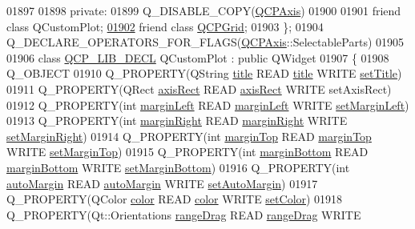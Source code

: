 \begin{DoxyCode}
01897   
01898 \textcolor{keyword}{private}:
01899   Q\_DISABLE\_COPY(\hyperlink{a00025}{QCPAxis})
01900   
01901   friend class QCustomPlot;
\hypertarget{a00116_source_l01902}{}\hyperlink{a00025_a061e177f585549fc31f780852e2bd6fe}{01902}   friend class \hyperlink{a00030_de/df3/a00185}{QCPGrid};
01903 \};
01904 Q\_DECLARE\_OPERATORS\_FOR\_FLAGS(\hyperlink{a00025}{QCPAxis}::SelectableParts)
01905 
01906 class \hyperlink{a00116_a5eaab02224a642ded7fb8951e973a02c}{QCP\_LIB\_DECL} QCustomPlot : public QWidget
01907 \{
01908   Q\_OBJECT
01910   Q\_PROPERTY(QString \hyperlink{a00116_aec7f0fb0be1d3a0a946f0ded3a860d20}{title} READ \hyperlink{a00116_aec7f0fb0be1d3a0a946f0ded3a860d20}{title} WRITE \hyperlink{a00116_a84257c1e1f984b3932245069428f3176}{setTitle})
01911   Q\_PROPERTY(QRect \hyperlink{a00116_ad1541f59ff23332e3245b74af2fd3833}{axisRect} READ \hyperlink{a00116_ad1541f59ff23332e3245b74af2fd3833}{axisRect} WRITE setAxisRect)
01912   Q\_PROPERTY(\textcolor{keywordtype}{int} \hyperlink{a00116_ae58a601ccf3bfb4a4f05ad2c30cf3f7b}{marginLeft} READ \hyperlink{a00116_ae58a601ccf3bfb4a4f05ad2c30cf3f7b}{marginLeft} WRITE 
      \hyperlink{a00116_a3be3a999be642fc336d4f4bf8299b27a}{setMarginLeft})
01913   Q\_PROPERTY(\textcolor{keywordtype}{int} \hyperlink{a00116_a8e815aa0d9167e8eee7fde2b9543aeee}{marginRight} READ \hyperlink{a00116_a8e815aa0d9167e8eee7fde2b9543aeee}{marginRight} WRITE 
      \hyperlink{a00116_a1822d02903f715e6910c0b55dd1506b9}{setMarginRight})
01914   Q\_PROPERTY(\textcolor{keywordtype}{int} \hyperlink{a00116_a56fe549a0ee79bcce78d4167eb47ea7b}{marginTop} READ \hyperlink{a00116_a56fe549a0ee79bcce78d4167eb47ea7b}{marginTop} WRITE \hyperlink{a00116_a3078bfcda0a3eda7782d8ca01f71ad7e}{setMarginTop})
01915   Q\_PROPERTY(\textcolor{keywordtype}{int} \hyperlink{a00116_aacbbba4878b8011eac2d51c346734458}{marginBottom} READ \hyperlink{a00116_aacbbba4878b8011eac2d51c346734458}{marginBottom} WRITE 
      \hyperlink{a00116_a87d42c0b0a224f9f9e43013fff4199d9}{setMarginBottom})
01916   Q\_PROPERTY(\textcolor{keywordtype}{int} \hyperlink{a00116_a2bfd7565f3ef76ca1fd87869999ae2c1}{autoMargin} READ \hyperlink{a00116_a2bfd7565f3ef76ca1fd87869999ae2c1}{autoMargin} WRITE 
      \hyperlink{a00116_aed5bb30c9b04c1d0103ab8ef7190f23a}{setAutoMargin})
01917   Q\_PROPERTY(QColor \hyperlink{a00116_ae35093fbf4f645dcefd930ca8c68b622}{color} READ \hyperlink{a00116_ae35093fbf4f645dcefd930ca8c68b622}{color} WRITE \hyperlink{a00116_a858bbcf98637471449e438304a00624b}{setColor})
01918   Q\_PROPERTY(Qt::Orientations \hyperlink{a00116_aa510cedc21252e5b8cf940b5414091fd}{rangeDrag} READ \hyperlink{a00116_aa510cedc21252e5b8cf940b5414091fd}{rangeDrag} WRITE 

\end{DoxyCode}
